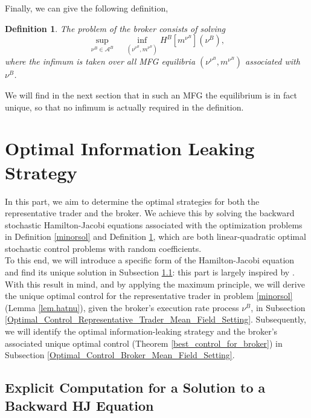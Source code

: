 \documentclass[10pt]{article}
\newtheorem{definition}[theorem]{Definition}
\begin{document}
Finally, we can give the following definition,
\begin{definition}\label{majorsol}
The problem of the broker consists of solving
$$\underset{\nu^B \in \mathcal{A}^B}{\sup} \quad \underset{(\nu^{\nu^B}, m^{\nu^B})}{\inf} H^{B}[m^{\nu^B}] (\nu^B),$$
where the infimum is taken over all MFG equilibria $(\nu^{\nu^B}, m^{\nu^B})$ associated with $\nu^B$.
\end{definition}
We will find in the next section that in such an MFG the equilibrium is in fact unique, so that no infimum is actually required in the definition.


\section{Optimal Information Leaking Strategy}\label{section_solution}

In this part, we aim to determine the optimal strategies for both the representative trader and the broker. We achieve this by solving the backward stochastic Hamilton-Jacobi equations associated with the optimization problems in Definition \ref{minorsol} and Definition \ref{majorsol}, which are both linear-quadratic optimal stochastic control problems with random coefficients.\\

To this end, we will introduce a specific form of the Hamilton-Jacobi equation and find its unique solution in Subsection \ref{general_HJ_equation}: this part is largely inspired by \citeauthor{bismut1976linear} \cite{bismut1976linear}. 
With this result in mind, and by applying the maximum principle, we will derive the unique optimal control for the representative trader in problem \eqref{minorsol} (Lemma \ref{lem.hatnu}), given the broker's execution rate process \( \nu^B \), in Subsection \ref{Optimal_Control_Representative_Trader_Mean_Field_Setting}. 
Subsequently, we will identify the optimal information-leaking strategy and the broker's associated unique optimal control (Theorem \ref{best_control_for_broker}) in Subsection \ref{Optimal_Control_Broker_Mean_Field_Setting}.


\subsection{Explicit Computation for a Solution to a Backward HJ Equation}\label{general_HJ_equation}
\end{document}
